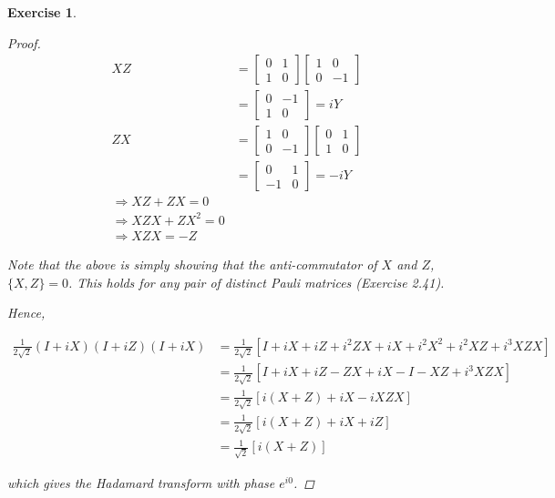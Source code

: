 \documentclass[11pt]{article}
\newcommand\0{\mathbf{0}}
\newcommand\<{\langle}
\renewcommand\>{\rangle}
\renewcommand\implies{\Rightarrow}
\newtheorem{exercise}[theorem]{Exercise}
\begin{document}
\begin{exercise}
\begin{proof}
\begin{align*}
XZ &= \begin{bmatrix}0 & 1 \\ 1 & 0\end{bmatrix}	\begin{bmatrix}1 & 0 \\ 0 & -1\end{bmatrix}	\\
&= \begin{bmatrix} 0 & -1 \\ 1 & 0 \end{bmatrix} = iY \\
ZX &= \begin{bmatrix}1 & 0 \\ 0 & -1\end{bmatrix}\begin{bmatrix}0 & 1 \\ 1 & 0\end{bmatrix} \\
&= \begin{bmatrix} 0 & 1 \\ -1 & 0 \end{bmatrix} = -iY \\
\implies XZ + ZX = 0 \\
\implies XZX + ZX^2 = 0 \\
\implies XZX = -Z 
\end{align*}

Note that the above is simply showing that the anti-commutator of $X$ and $Z$, $\{ X , Z\} = 0$. This holds for any pair of distinct Pauli matrices (Exercise 2.41). 

Hence,

\begin{align*}
	\frac{1}{2\sqrt{2}}( I + iX)( I + iZ)( I + iX) &= \frac{1}{2\sqrt{2}}[I + iX + iZ + i^2ZX + iX + i^2X^2 + i^2XZ + i^3XZX ]\\
	&= \frac{1}{2\sqrt{2}}[I + iX + iZ - ZX  + iX - I - XZ + i^3 XZX] \\
	&= \frac{1}{2\sqrt{2}}[i (X + Z)  + iX -i XZX ]\\
	&= \frac{1}{2\sqrt{2}}[i(X + Z) + iX + iZ ]\\
	&= \frac{1}{\sqrt{2}}[i(X + Z)]
\end{align*}

which gives the Hadamard transform with phase $e^{i0}$. 

\end{proof}
	
\end{exercise}
\end{document}

